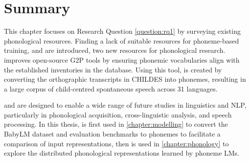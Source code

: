 

\section{Summary}

This chapter focuses on Research Question \ref{question:rq1} by surveying existing phonological resources. Finding a lack of suitable resources for phoneme-based training, \gpp and \ipachildes are introduced, two new resources for phonological research. \gpp improves open-source G2P tools by ensuring phonemic vocabularies align with the established inventories in the \phoible database. Using this tool, \ipachildes is created by converting the orthographic transcripts in CHILDES into phonemes, resulting in a large corpus of child-centred spontaneous speech across 31 languages.

\gpp and \ipachildes are designed to enable a wide range of future studies in linguistics and NLP, particularly in phonological acquisition, cross-linguistic analysis, and speech processing. In this thesis, \gpp is first used in \cref{chapter:modelling} to convert the BabyLM dataset and evaluation benchmarks to phonemes to facilitate a comparison of input representations, then \ipachildes is used in \cref{chapter:phonology} to explore the distributed phonological representations learned by phoneme LMs. 





